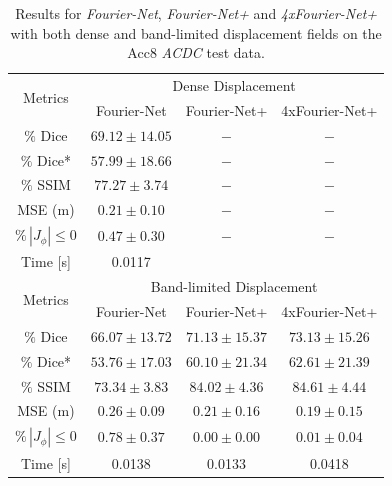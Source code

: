\documentclass[english,version-2022-01]{uzl-thesis} %
\begin{document}
\begin{table}[h] %
	\centering
	\caption{Results for \emph{Fourier-Net}, \emph{Fourier-Net+} and \emph{4xFourier-Net+} with both dense and band-limited displacement fields on the Acc8 \emph{ACDC} test data.}
	\label{tab:DenseDisplacementAcc8}
	\begin{tabular}{c c c c} %
		\toprule
		\multirow{2}{*}{Metrics} & \multicolumn{3}{c}{Dense Displacement} \\
		\cline{2-4} 
		 & Fourier-Net & Fourier-Net+ & 4xFourier-Net+\\	
		\midrule
		$\%$ Dice & $69.12 \pm 14.05$ & $-$ & $-$\\
		$\%$ Dice* & $57.99 \pm 18.66$ & $-$ & $-$ \\
		$\%$ SSIM & $77.27 \pm 3.74$ & $-$ & $-$\\
		MSE (m) & $0.21 \pm 0.10$ & $-$ & $-$ \\
		$\% \, |J_{\phi}|\leq0$ & $0.47 \pm 0.30$ & $-$ & $-$ \\
		Time [s] 	  & 0.0117  	&  	&   \\
		\midrule
		\multirow{2}{*}{Metrics} & \multicolumn{3}{c}{Band-limited Displacement} \\
		\cline{2-4} 
		 & Fourier-Net & Fourier-Net+ & 4xFourier-Net+\\		
		\midrule
		$\%$ Dice & $66.07 \pm 13.72$ & $71.13 \pm 15.37$ & $73.13 \pm 15.26$\\
		$\%$ Dice* & $53.76 \pm 17.03$ & $60.10 \pm 21.34$ & $62.61 \pm 21.39$ \\
		$\%$ SSIM & $73.34 \pm 3.83$ & $84.02 \pm 4.36$ & $84.61 \pm 4.44$\\
		MSE (m) & $0.26 \pm 0.09$ & $0.21 \pm 0.16$ & $0.19 \pm 0.15$ \\
		$\% \, |J_{\phi}|\leq0$ & $0.78 \pm 0.37$ & $0.00 \pm 0.00$ & $0.01 \pm 0.04$ \\
		Time [s] 	  & 0.0138 & 0.0133 & 0.0418  \\
		\bottomrule
	\end{tabular}	
\end{table}
\end{document}
